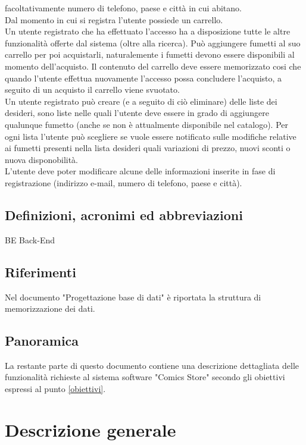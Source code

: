 \documentclass{scrreprt}
\begin{document}
facoltativamente numero di telefono, paese e città in cui abitano.\\
Dal momento in cui si registra l’utente possiede un carrello.\\
Un utente registrato che ha effettuato l'accesso ha a disposizione tutte le altre funzionalità offerte
dal sistema (oltre alla ricerca). Può aggiungere fumetti al suo carrello per poi acquistarli, naturalemente
i fumetti devono essere disponibili al momento dell'acquisto. Il contenuto del carrello deve essere memorizzato
cosi che quando l'utente effettua nuovamente l'accesso possa concludere l'acquisto, a seguito di un acquisto il
carrello viene svuotato.\\
Un utente registrato può creare (e a seguito di ciò eliminare) delle liste dei desideri, sono liste nelle quali
l'utente deve essere in grado di aggiungere qualunque fumetto (anche se non è attualmente disponibile nel catalogo).
Per ogni lista l'utente può scegliere se vuole essere notificato sulle modifiche relative ai fumetti presenti
nella lista desideri quali variazioni di prezzo, nuovi sconti o nuova disponobilità.\\
L'utente deve poter modificare alcune delle informazioni inserite in fase di registrazione (indirizzo e-mail,
numero di telefono, paese e città).

\section{Definizioni, acronimi ed abbreviazioni}
BE Back-End

\section{Riferimenti}
Nel documento "Progettazione base di dati" è riportata la struttura di memorizzazione dei dati.

\section{Panoramica}
La restante parte di questo documento contiene una descrizione dettagliata delle funzionalità richieste
al sistema software "Comics Store" secondo gli obiettivi espressi al punto \ref*{obiettivi}.


\chapter{Descrizione generale}
\end{document}
